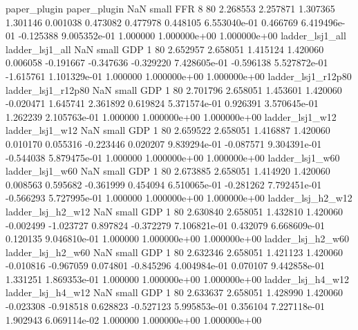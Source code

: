             paper_plugin             paper_plugin                   NaN      small      FFR                 8 80 2.268553       2.257871 1.307365       1.301146    0.001038      0.473082      0.477978     0.448105   6.553040e-01  0.466769 6.419496e-01    -0.125388   9.005352e-01            1.000000    1.000000e+00        1.000000e+00
         ladder_lsj1_all          ladder_lsj1_all                   NaN      small      GDP                 1 80 2.652957       2.658051 1.415124       1.420060    0.006058     -0.191667     -0.347636    -0.329220   7.428605e-01 -0.596138 5.527872e-01    -1.615761   1.101329e-01            1.000000    1.000000e+00        1.000000e+00
      ladder_lsj1_r12p80       ladder_lsj1_r12p80                   NaN      small      GDP                 1 80 2.701796       2.658051 1.453601       1.420060   -0.020471      1.645741      2.361892     0.619824   5.371574e-01  0.926391 3.570645e-01     1.262239   2.105763e-01            1.000000    1.000000e+00        1.000000e+00
         ladder_lsj1_w12          ladder_lsj1_w12                   NaN      small      GDP                 1 80 2.659522       2.658051 1.416887       1.420060    0.010170      0.055316     -0.223446     0.020207   9.839294e-01 -0.087571 9.304391e-01    -0.544038   5.879475e-01            1.000000    1.000000e+00        1.000000e+00
         ladder_lsj1_w60          ladder_lsj1_w60                   NaN      small      GDP                 1 80 2.673885       2.658051 1.414920       1.420060    0.008563      0.595682     -0.361999     0.454094   6.510065e-01 -0.281262 7.792451e-01    -0.566293   5.727995e-01            1.000000    1.000000e+00        1.000000e+00
       ladder_lsj_h2_w12        ladder_lsj_h2_w12                   NaN      small      GDP                 1 80 2.630840       2.658051 1.432810       1.420060   -0.002499     -1.023727      0.897824    -0.372279   7.106821e-01  0.432079 6.668609e-01     0.120135   9.046810e-01            1.000000    1.000000e+00        1.000000e+00
       ladder_lsj_h2_w60        ladder_lsj_h2_w60                   NaN      small      GDP                 1 80 2.632346       2.658051 1.421123       1.420060   -0.010816     -0.967059      0.074801    -0.845296   4.004984e-01  0.070107 9.442858e-01     1.331251   1.869353e-01            1.000000    1.000000e+00        1.000000e+00
       ladder_lsj_h4_w12        ladder_lsj_h4_w12                   NaN      small      GDP                 1 80 2.633637       2.658051 1.428990       1.420060   -0.023308     -0.918518      0.628823    -0.527123   5.995853e-01  0.356104 7.227118e-01     1.902943   6.069114e-02            1.000000    1.000000e+00        1.000000e+00
